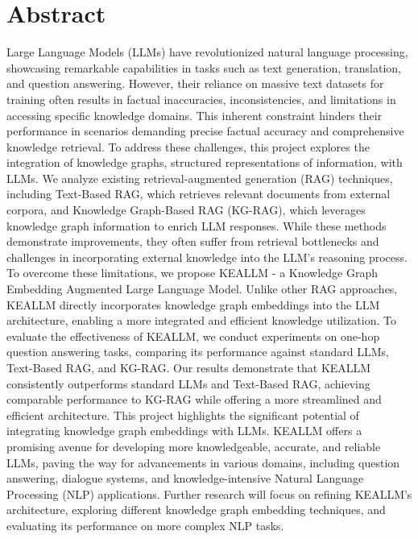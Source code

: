 \section*{\Huge Abstract}
Large Language Models (LLMs) have revolutionized natural language processing, showcasing remarkable capabilities in tasks such as text generation, translation, and question answering. However, their reliance on massive text datasets for training often results in factual inaccuracies, inconsistencies, and limitations in accessing specific knowledge domains. This inherent constraint hinders their performance in scenarios demanding precise factual accuracy and comprehensive knowledge retrieval. To address these challenges, this project explores the integration of knowledge graphs, structured representations of information, with LLMs. We analyze existing retrieval-augmented generation (RAG) techniques, including Text-Based RAG, which retrieves relevant documents from external corpora, and Knowledge Graph-Based RAG (KG-RAG), which leverages knowledge graph information to enrich LLM responses. While these methods demonstrate improvements, they often suffer from retrieval bottlenecks and challenges in incorporating external knowledge into the LLM's reasoning process. To overcome these limitations, we propose KEALLM - a Knowledge Graph Embedding Augmented Large Language Model. Unlike other RAG approaches, KEALLM directly incorporates knowledge graph embeddings into the LLM architecture, enabling a more integrated and efficient knowledge utilization. To evaluate the effectiveness of KEALLM, we conduct experiments on one-hop question answering tasks, comparing its performance against standard LLMs, Text-Based RAG, and KG-RAG. Our results demonstrate that KEALLM consistently outperforms standard LLMs and Text-Based RAG, achieving comparable performance to KG-RAG while offering a more streamlined and efficient architecture. This project highlights the significant potential of integrating knowledge graph embeddings with LLMs. KEALLM offers a promising avenue for developing more knowledgeable, accurate, and reliable LLMs, paving the way for advancements in various domains, including question answering, dialogue systems, and knowledge-intensive Natural Language Processing (NLP) applications. Further research will focus on refining KEALLM's architecture, exploring different knowledge graph embedding techniques, and evaluating its performance on more complex NLP tasks.
